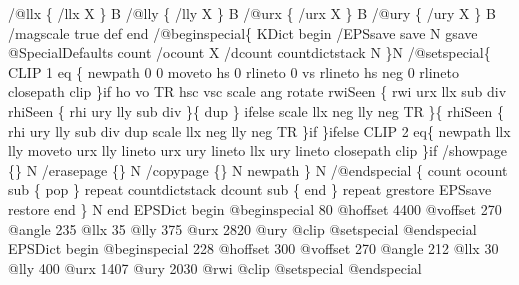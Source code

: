 \documentclass[11pt]{article}
\begin{document}
    /@llx \{ /llx X \} B
    /@lly \{ /lly X \} B
    /@urx \{ /urx X \} B
    /@ury \{ /ury X \} B
    /magscale true def
    end %
  /@beginspecial\{
    KDict begin %
      /EPSsave save N
      gsave
        @SpecialDefaults count /ocount X
        /dcount countdictstack N
    \}N
  /@setspecial\{
    CLIP 1 eq \{
      newpath 0 0 moveto hs 0 rlineto 0 vs rlineto hs neg 0 rlineto closepath clip
      \}if
    ho vo TR hsc vsc scale ang rotate
    rwiSeen \{
      rwi urx llx sub div
      rhiSeen \{ rhi ury lly sub div \}\{ dup \} ifelse
      scale llx neg lly neg TR
     \}\{
      rhiSeen \{ rhi ury lly sub div dup scale llx neg lly neg TR \}if
      \}ifelse
    CLIP 2 eq\{
      newpath llx lly moveto urx lly lineto urx ury lineto llx ury lineto closepath clip
      \}if
    /showpage \{\} N
    /erasepage \{\} N
    /copypage \{\} N
    newpath
    \} N
  /@endspecial \{
    count ocount sub \{ pop \} repeat
    countdictstack dcount sub \{ end \} repeat grestore
    EPSsave restore
    end %
    \} N
end
EPSDict begin
 @beginspecial
 80 @hoffset 4400 @voffset  %
 270 @angle                          %
 235 @llx 35 @lly 375 @urx 2820 @ury %
 @clip
 @setspecial
 @endspecial %
EPSDict begin
 @beginspecial
 228 @hoffset 300 @voffset   %
 270 @angle                          %
 212 @llx 30 @lly 400 @urx 1407 @ury %
 2030 @rwi
 @clip
 @setspecial
 @endspecial %
\end{document}
